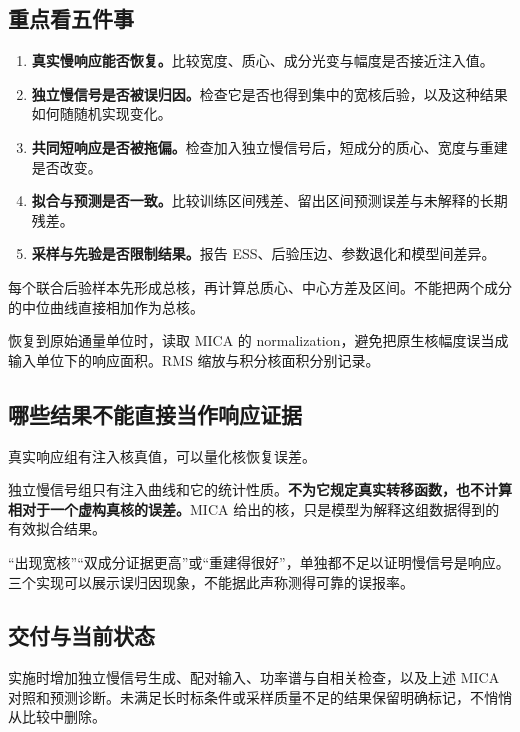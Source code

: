 \documentclass[11pt,a4paper]{article}
\begin{document}
\subsection*{{\zhfont 重点看五件事}}

\begin{enumerate}
\item \textbf{{\zhfont 真实慢响应能否恢复。}}{\zhfont 比较宽度、质心、成分光变与幅度是否接近注入值。}
\item \textbf{{\zhfont 独立慢信号是否被误归因。}}{\zhfont 检查它是否也得到集中的宽核后验，以及这种结果如何随随机实现变化。}
\item \textbf{{\zhfont 共同短响应是否被拖偏。}}{\zhfont 检查加入独立慢信号后，短成分的质心、宽度与重建是否改变。}
\item \textbf{{\zhfont 拟合与预测是否一致。}}{\zhfont 比较训练区间残差、留出区间预测误差与未解释的长期残差。}
\item \textbf{{\zhfont 采样与先验是否限制结果。}}{\zhfont 报告} ESS{\zhfont 、后验压边、参数退化和模型间差异。}
\end{enumerate}

{\zhfont 每个联合后验样本先形成总核，再计算总质心、中心方差及区间。不能把两个成分的中位曲线直接相加作为总核。}

{\zhfont 恢复到原始通量单位时，读取} MICA {\zhfont 的} normalization{\zhfont ，避免把原生核幅度误当成输入单位下的响应面积。}RMS {\zhfont 缩放与积分核面积分别记录。}

\subsection*{{\zhfont 哪些结果不能直接当作响应证据}}

{\zhfont 真实响应组有注入核真值，可以量化核恢复误差。}

{\zhfont 独立慢信号组只有注入曲线和它的统计性质。}\textbf{{\zhfont 不为它规定真实转移函数，也不计算相对于一个虚构真核的误差。}}MICA {\zhfont 给出的核，只是模型为解释这组数据得到的有效拟合结果。}

“{\zhfont 出现宽核}”“{\zhfont 双成分证据更高}”{\zhfont 或}“{\zhfont 重建得很好}”{\zhfont ，单独都不足以证明慢信号是响应。三个实现可以展示误归因现象，不能据此声称测得可靠的误报率。}

\subsection*{{\zhfont 交付与当前状态}}

{\zhfont 实施时增加独立慢信号生成、配对输入、功率谱与自相关检查，以及上述} MICA {\zhfont 对照和预测诊断。未满足长时标条件或采样质量不足的结果保留明确标记，不悄悄从比较中删除。}
\end{document}
